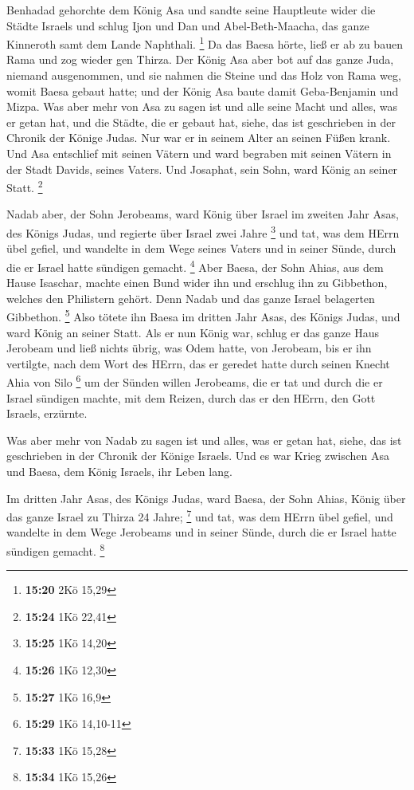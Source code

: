  Benhadad gehorchte dem König Asa und sandte seine
Hauptleute wider die Städte Israels und schlug Ijon und Dan und
Abel-Beth-Maacha, das ganze Kinneroth samt dem Lande Naphthali.
\footnote{\textbf{15:20} 2Kö 15,29}  Da das Baesa hörte,
ließ er ab zu bauen Rama und zog wieder gen Thirza.  Der
König Asa aber bot auf das ganze Juda, niemand ausgenommen, und sie
nahmen die Steine und das Holz von Rama weg, womit Baesa gebaut hatte;
und der König Asa baute damit Geba-Benjamin und Mizpa.  Was
aber mehr von Asa zu sagen ist und alle seine Macht und alles, was er
getan hat, und die Städte, die er gebaut hat, siehe, das ist geschrieben
in der Chronik der Könige Judas. Nur war er in seinem Alter an seinen
Füßen krank.  Und Asa entschlief mit seinen Vätern und ward
begraben mit seinen Vätern in der Stadt Davids, seines Vaters. Und
Josaphat, sein Sohn, ward König an seiner Statt. \footnote{\textbf{15:24}
  1Kö 22,41}

 Nadab aber, der Sohn Jerobeams, ward König über Israel im
zweiten Jahr Asas, des Königs Judas, und regierte über Israel zwei Jahre
\footnote{\textbf{15:25} 1Kö 14,20}  und tat, was dem HErrn
übel gefiel, und wandelte in dem Wege seines Vaters und in seiner Sünde,
durch die er Israel hatte sündigen gemacht. \footnote{\textbf{15:26} 1Kö
  12,30}  Aber Baesa, der Sohn Ahias, aus dem Hause
Isaschar, machte einen Bund wider ihn und erschlug ihn zu Gibbethon,
welches den Philistern gehört. Denn Nadab und das ganze Israel
belagerten Gibbethon. \footnote{\textbf{15:27} 1Kö 16,9} 
Also tötete ihn Baesa im dritten Jahr Asas, des Königs Judas, und ward
König an seiner Statt.  Als er nun König war, schlug er das
ganze Haus Jerobeam und ließ nichts übrig, was Odem hatte, von Jerobeam,
bis er ihn vertilgte, nach dem Wort des HErrn, das er geredet hatte
durch seinen Knecht Ahia von Silo \footnote{\textbf{15:29} 1Kö 14,10-11}
 um der Sünden willen Jerobeams, die er tat und durch die
er Israel sündigen machte, mit dem Reizen, durch das er den HErrn, den
Gott Israels, erzürnte.

 Was aber mehr von Nadab zu sagen ist und alles, was er
getan hat, siehe, das ist geschrieben in der Chronik der Könige Israels.
 Und es war Krieg zwischen Asa und Baesa, dem König
Israels, ihr Leben lang.

 Im dritten Jahr Asas, des Königs Judas, ward Baesa, der
Sohn Ahias, König über das ganze Israel zu Thirza 24 Jahre; \footnote{\textbf{15:33}
  1Kö 15,28}  und tat, was dem HErrn übel gefiel, und
wandelte in dem Wege Jerobeams und in seiner Sünde, durch die er Israel
hatte sündigen gemacht. \footnote{\textbf{15:34} 1Kö 15,26}


